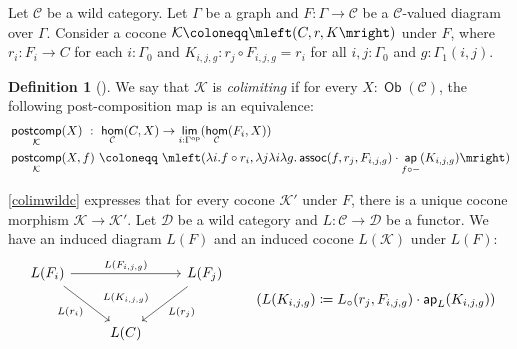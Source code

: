 \documentclass[10pt,a4paper]{article}
\theoremstyle{definition}
\newtheorem{defi}[thm]{Definition}
\theoremstyle{remark}
\newcommand{\C}{\mathcal C}
\newcommand{\D}{\mathcal D}
\newcommand{\K}{\mathcal K}
\newcommand{\0}{\mathbf{0}}
\newcommand{\1}{\mathbf{1}}
\newcommand{\2}{\mathbf{2}}
\DeclareMathOperator{\assoc}{\mathsf{assoc}}
\DeclareMathOperator{\ap}{\mathsf{ap}}
\DeclareMathOperator{\homm}{\mathsf{hom}}
\DeclareMathOperator{\op}{op}
\DeclareMathOperator{\limm}{\mathsf{lim}}
\DeclareMathOperator{\obb}{\mathsf{Ob}}
\DeclareMathOperator{\postcomp}{\mathsf{postcomp}}
\newcommand{\myhref}[2]{%
  \href{#1}{\textcolor{blue!30!black}{#2}}%
}
\begin{document}
Let $\C$ be a wild category. Let $\Gamma$ be a graph and $F : \Gamma \to \C$ be a $\C$-valued diagram over $\Gamma$. Consider a cocone $\K \coloneqq \mleft(C, r, K\mright)$ under $F$, where $r_i : F_i \to C$ for each $i : \Gamma_0$ and $K_{i,j,g} :  r_j \circ F_{i,j,g}  = r_i$ for all $i, j : \Gamma_0$ and $g : \Gamma_1(i,j)$.
\begin{defi}[{\cite[\myhref{https://github.com/PHart3/colimits-agda/blob/lapc-lmcs/HoTT-Agda/core/lib/wild-cats/Colim-wc.agda\#L22}{is-colim}]{2cohagda-pub}}] \label{colimwildc}
We say that $\K$ is \emph{colimiting} if for every $X : \obb(\C)$, the following post-composition map is an equivalence:
\begin{align*}
& \postcomp_{\K}(X) \ : \ \homm_{\C}(C, X) \to \limm_{i : \Gamma^{\op}}(\homm_{\C}(F_i, X))
\\ & \postcomp_{\K}(X,f) \ \coloneqq \ \mleft(\lambda{i}.f \circ r_i, \lambda{j}\lambda{i}\lambda{g}.\assoc(f, r_j, F_{i,j,g}) \cdot \ap_{f \circ {-}}(K_{i,j,g})  \mright)
\end{align*}
\end{defi}
\autoref{colimwildc} expresses that for every cocone $\K'$ under $F$, there is a unique cocone morphism $\K \to \K'$. Let $\D$ be a wild category and $L : \C \to \D$ be a functor. We have an induced diagram $L(F)$ and an induced cocone $L(\K)$ under $L(F)$:
\[\begin{tikzcd}[row sep = 25]
	{L(F_i)} && {L(F_j)} \\
	& {L(C)}
	\arrow[""{name=0, anchor=center, inner sep=0}, "{L(F_{i,j,g})}", from=1-1, to=1-3]
	\arrow["{L(r_i)}"', from=1-1, to=2-2]
	\arrow["{L(r_j)}", from=1-3, to=2-2]
	\arrow["{L(K_{i,j,g})}"{description}, draw=none, from=0, to=2-2]
\end{tikzcd}
\tag{$L(K_{i,j,g}) \coloneqq L_{\circ}(r_j, F_{i,j,g}) \cdot \ap_L(K_{i,j,g})$}\] 
\end{document}
